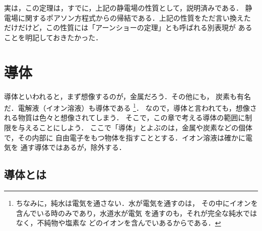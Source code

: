         実は，この定理は，すでに，上記の静電場の性質として，説明済みである．
        静電場に関するポアソン方程式からの帰結である．上記の性質をただ言い換えた
        だけだけど，この性質には「アーンショーの定理」とも呼ばれる別表現が
        あることを明記しておきたかった．


    \section{導体}
        \begin{mycomment}
            導体といわれると，まず想像するのが，金属だろう．その他にも，
            炭素も有名だ．電解液（イオン溶液）も導体である
                \footnote{
                    ちなみに，純水は電気を通さない．水が電気を通すのは，
                    その中にイオンを含んでいる時のみであり，水道水が電気
                    を通すのも，それが完全な純水ではなく，不純物や塩素な
                    どのイオンを含んでいあるからである．
                }．
            なので，導体と言われても，想像される物質は色々と想像されてしまう．
            そこで，この章で考える導体の範囲に制限を与えることにしよう．
            ここで「導体」とよぶのは，金属や炭素などの個体で，その内部に
            自由電子をもつ物体を指すこととする．イオン溶液は確かに電気を
            通す導体ではあるが，除外する．
        \end{mycomment}

    \subsection{導体とは}

